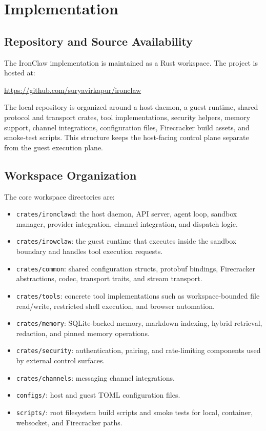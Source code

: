 
\chapter{Implementation}
\label{Chapter5}
\sloppy

\section{Repository and Source Availability}
The IronClaw implementation is maintained as a Rust workspace. The project is
hosted at:
\begin{center}
\url{https://github.com/suryavirkapur/ironclaw}
\end{center}

The local repository is organized around a host daemon, a guest runtime, shared
protocol and transport crates, tool implementations, security helpers, memory
support, channel integrations, configuration files, Firecracker build assets,
and smoke-test scripts. This structure keeps the host-facing control plane
separate from the guest execution plane.

\section{Workspace Organization}
The core workspace directories are:
\begin{itemize}
    \item \texttt{crates/ironclawd}: the host daemon, API server, agent loop,
    sandbox manager, provider integration, channel integration, and dispatch
    logic.
    \item \texttt{crates/irowclaw}: the guest runtime that executes inside the
    sandbox boundary and handles tool execution requests.
    \item \texttt{crates/common}: shared configuration structs, protobuf
    bindings, Firecracker abstractions, codec, transport traits, and stream
    transport.
    \item \texttt{crates/tools}: concrete tool implementations such as
    workspace-bounded file read/write, restricted shell execution, and browser
    automation.
    \item \texttt{crates/memory}: SQLite-backed memory, markdown indexing,
    hybrid retrieval, redaction, and pinned memory operations.
    \item \texttt{crates/security}: authentication, pairing, and rate-limiting
    components used by external control surfaces.
    \item \texttt{crates/channels}: messaging channel integrations.
    \item \texttt{configs/}: host and guest TOML configuration files.
    \item \texttt{scripts/}: root filesystem build scripts and smoke tests for
    local, container, websocket, and Firecracker paths.
\end{itemize}

